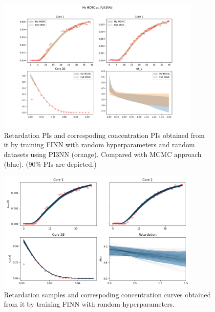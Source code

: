\begin{figure}
    \centering
    \includegraphics[width=0.9\textwidth]{figs/finn_My MCMCvsFull SPAN_PIs.png}
    \caption{Retardation PIs and correspoding concentration PIs obtained from it by training FINN with random hyperparameters and random datasets using PI3NN (orange). Compared with MCMC approach (blue). (90\% PIs are depicted.)}
    \label{fig:mcmc_vs_fullspan}
\end{figure}


\begin{figure}
    \centering
    \includegraphics[width=0.9\textwidth]{figs/finn_span_samples.png}
    \caption{Retardation samples and correspoding concentration curves obtained from it by training FINN with random hyperparameters.}
    \label{fig:span_samples}
\end{figure}


